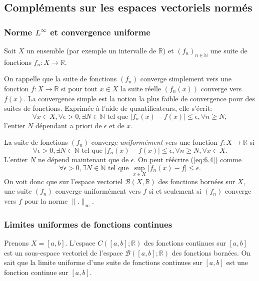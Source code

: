 \documentclass{article}
\begin{document}
\subsection{Compléments sur les espaces vectoriels normés}

\subsubsection{Norme $L^\infty$ et convergence uniforme}

Soit $X$ un ensemble (par exemple un intervalle de $\mathbb{R}$) et $(f_n)_{n \in \mathbb{N}}$ une suite de fonctions $f_n: X \rightarrow \mathbb{R}$.

On rappelle que la suite de fonctions $(f_n)$ converge simplement vers une fonction $f: X \rightarrow \mathbb{R}$ si pour tout $x \in X$ la suite réelle $(f_n(x))$ converge vers $f(x)$. La convergence simple est la notion la plus faible de convergence pour des suites de fonctions. Exprimée à l'aide de quantificateurs, elle s'écrit:
\begin{equation}
    \forall x \in X, \forall \epsilon > 0, \exists N \in \mathbb{N} \text{ tel que } |f_n(x) - f(x)| \leq \epsilon, \forall n \geq N,
\end{equation}
l'entier $N$ dépendant a priori de $\epsilon$ et de $x$.

La suite de fonctions $(f_n)$ converge \textit{uniformément} vers une fonction $f: X \rightarrow \mathbb{R}$ si
\begin{equation}
    \forall \epsilon > 0, \exists N \in \mathbb{N} \text{ tel que } |f_n(x) - f(x)| \leq \epsilon, \forall n \geq N, \forall x \in X.
\end{equation}
L'entier $N$ ne dépend maintenant que de $\epsilon$. On peut réécrire (\ref{eq:6.4}) comme
\begin{equation}
    \forall \epsilon > 0, \exists N \in \mathbb{N} \text{ tel que } \sup_{x \in X} |f_n(x) - f| \leq \epsilon.
\end{equation}
On voit donc que sur l'espace vectoriel $\mathcal{B}(X, \mathbb{R})$ des fonctions bornées sur $X$, une suite $(f_n)$ converge uniformément vers $f$ si et seulement si $(f_n)$ converge vers $f$ pour la norme $\|.\|_\infty$.

\subsubsection{Limites uniformes de fonctions continues}

Prenons $X = [a, b]$. L'espace $C([a, b]; \mathbb{R})$ des fonctions continues sur $[a, b]$ est un sous-espace vectoriel de l'espace $\mathcal{B}([a, b]; \mathbb{R})$ des fonctions bornées. On sait que la limite uniforme d'une suite de fonctions continues sur $[a, b]$ est une fonction continue sur $[a, b]$.
\end{document}

